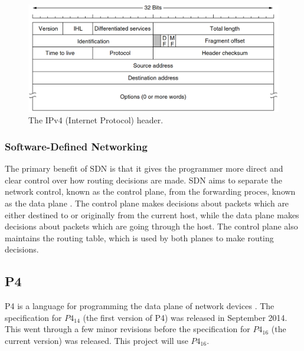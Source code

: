 \documentclass[12pt, a4paper, twoside, onecolumn]{article}
\begin{document}
\begin{figure}[h]
	\begin{center}
		\includegraphics[width=14cm]{ip_header.png}
	\end{center}
	\caption{The IPv4 (Internet Protocol) header. \cite{tanenbaum}}
	\label{ip_header}
\end{figure}

\subsubsection{Software-Defined Networking}
\label{software_defined_networking}
The primary benefit of SDN is that it gives the programmer more direct and clear control over how routing decisions are made. SDN aims to separate the network control, known as the control plane, from the forwarding proces, known as the data plane \cite{software_defined_networking_survey}. The control plane makes decisions about packets which are either destined to or originally from the current host, while the data plane makes decisions about packets which are going through the host. The control plane also maintains the routing table, which is used by both planes to make routing decisions.

\subsection{P4}
\label{p4_research}
P4 is a language for programming the data plane of network devices \cite{P4}. The specification for $P4_{14}$ (the first version of P4) was released in September 2014. This went through a few minor revisions before the specification for $P4_{16}$ (the current version) was released. This project will use $P4_{16}$.

%
\end{document}
